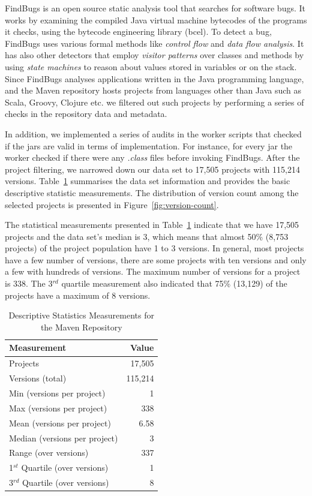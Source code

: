 \documentclass{sig-alternate}
\begin{document}
FindBugs is an open source static analysis tool that
searches for software bugs. It works by examining the compiled Java virtual
machine bytecodes of the programs it checks, using the bytecode engineering
library ({\sc bcel}).
To detect a bug, FindBugs uses various formal methods like
{\it control flow} and {\it data flow
analysis}. It has also other detectors that employ {\it visitor patterns} over
classes and methods by using {\it state machines} to reason about values stored
in variables or on the stack.
Since FindBugs analyses applications written in the Java
programming language, and the Maven repository
hosts projects from languages other than Java such as Scala, Groovy,
Clojure etc. we filtered out such projects by performing a series of checks in
the repository data and metadata.

In addition, we implemented a series of audits in the worker scripts that
checked if the {\sc jar}s are valid in terms of implementation. For instance,
for every {\sc jar} the worker checked if there were any {\it .class} files
before invoking FindBugs. After the project filtering, we narrowed down
our data set to 17,505 projects with 115,214 versions.
Table~\ref{tbl:repository} summarises the data set information and
provides the basic descriptive statistic measurements. The distribution of version
count among the selected projects is presented in Figure~\ref{fig:version-count}.

The statistical measurements presented in Table~\ref{tbl:repository}
indicate that we have 17,505 projects and the data set's median is 3,
which means that almost 50\% (8,753 projects) of the project
population have 1 to 3 versions. In general, most projects have a few
number of versions, there are some projects with ten versions and
only a few with hundreds of versions. The maximum number of versions
for a project is 338. The 3$^{rd}$ quartile measurement also indicated
that 75\% (13,129) of the projects have a maximum of 8 versions.

\begin{table}[t]
\centering
\caption{Descriptive Statistics Measurements for the Maven Repository}
\label{tbl:repository}
\begin{tabular}{l r}
\hline
Measurement & Value\\
 \hline
Projects & 17,505\\
Versions (total) & 115,214\\
Min (versions per project) & 1\\
Max (versions per project) & 338\\
Mean (versions per project) & 6.58\\
Median (versions per project) & 3\\
Range (over versions) & 337\\
1$^{st}$ Quartile (over versions) & 1\\
3$^{rd}$ Quartile (over versions) & 8\\
\hline
\end{tabular}
\end{table}
\end{document}
